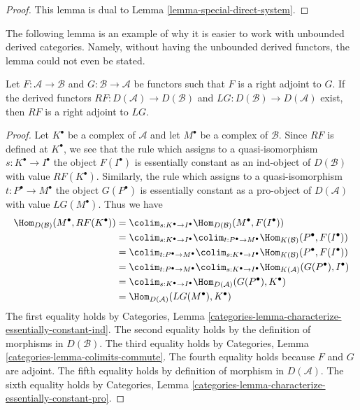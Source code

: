 \begin{proof}
This lemma is dual to
Lemma \ref{lemma-special-direct-system}.
\end{proof}

\noindent
The following lemma is an example of why it is easier to work
with unbounded derived categories. Namely, without having the
unbounded derived functors, the lemma could not even be stated.

\begin{lemma}
\label{lemma-derived-adjoint-functors}
Let $F : \mathcal{A} \to \mathcal{B}$ and $G : \mathcal{B} \to \mathcal{A}$
be functors such that $F$ is a right adjoint to $G$. If the derived functors
$RF : D(\mathcal{A}) \to D(\mathcal{B})$ and
$LG : D(\mathcal{B}) \to D(\mathcal{A})$ exist, then
$RF$ is a right adjoint to $LG$.
\end{lemma}

\begin{proof}
Let $K^\bullet$ be a complex of $\mathcal{A}$ and let $M^\bullet$ be
a complex of $\mathcal{B}$. Since $RF$ is defined at $K^\bullet$, we
see that the rule which assigns to a quasi-isomorphism
$s : K^\bullet \to I^\bullet$ the object $F(I^\bullet)$ is essentially
constant as an ind-object of $D(\mathcal{B})$ with value $RF(K^\bullet)$.
Similarly, the rule which assigns to a quasi-isomorphism
$t : P^\bullet \to M^\bullet$ the object $G(P^\bullet)$ is
essentially constant as a pro-object of $D(\mathcal{A})$
with value $LG(M^\bullet)$. Thus we have
\begin{align*}
\Hom_{D(\mathcal{B})}(M^\bullet, RF(K^\bullet))
& =
\colim_{s : K^\bullet \to I^\bullet}
\Hom_{D(\mathcal{B})}(M^\bullet, F(I^\bullet)) \\
& =
\colim_{s : K^\bullet \to I^\bullet}
\colim_{t : P^\bullet \to M^\bullet}
\Hom_{K(\mathcal{B})}(P^\bullet, F(I^\bullet)) \\
& =
\colim_{t : P^\bullet \to M^\bullet}
\colim_{s : K^\bullet \to I^\bullet}
\Hom_{K(\mathcal{B})}(P^\bullet, F(I^\bullet)) \\
& =
\colim_{t : P^\bullet \to M^\bullet}
\colim_{s : K^\bullet \to I^\bullet}
\Hom_{K(\mathcal{A})}(G(P^\bullet), I^\bullet) \\
& =
\colim_{s : K^\bullet \to I^\bullet}
\Hom_{D(\mathcal{A})}(G(P^\bullet), K^\bullet) \\
& = \Hom_{D(\mathcal{A})}(LG(M^\bullet), K^\bullet)
\end{align*}
The first equality holds by
Categories, Lemma \ref{categories-lemma-characterize-essentially-constant-ind}.
The second equality holds by the definition of morphisms in
$D(\mathcal{B})$. The third equality holds by
Categories, Lemma \ref{categories-lemma-colimits-commute}.
The fourth equality holds because $F$ and $G$ are adjoint.
The fifth equality holds by definition of morphism
in $D(\mathcal{A})$. The sixth equality holds by
Categories, Lemma \ref{categories-lemma-characterize-essentially-constant-pro}.
\end{proof}





